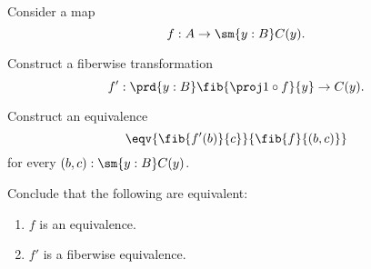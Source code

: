 \begin{exercises}
\item \label{ex:eqv_sigma_mv}Consider a map
\begin{equation*}
f:A \to \sm{y:B}C(y).
\end{equation*}
\begin{subexenum}
\item Construct a fiberwise transformation
\begin{equation*}
f':\prd{y:B} \fib{\proj 1\circ f}{y}\to C(y).
\end{equation*}
\item Construct an equivalence
\begin{equation*}
\eqv{\fib{f'(b)}{c}}{\fib{f}{(b,c)}}
\end{equation*}
for every $(b,c):\sm{y:B}C(y)$.
\item Conclude that the following are equivalent:
\begin{enumerate}
\item $f$ is an equivalence.
\item $f'$ is a fiberwise equivalence.
\end{enumerate}
\end{subexenum}
\end{exercises}
